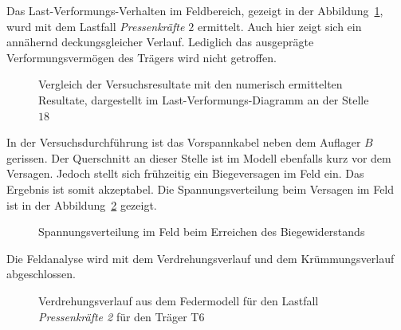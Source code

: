 \documentclass[
  11pt,
  letterpaper,
]{scrreprt}
\begin{document}
Das Last-Verformungs-Verhalten im Feldbereich, gezeigt in der
Abbildung~\ref{fig-q_w18_vergleich}, wurd mit dem Lastfall
\emph{Pressenkräfte \(2\)} ermittelt. Auch hier zeigt sich ein annähernd
deckungsgleicher Verlauf. Lediglich das ausgeprägte Verformungsvermögen
des Trägers wird nicht getroffen.

\begin{figure}[H]


\caption{\label{fig-q_w18_vergleich}Vergleich der Versuchsresultate mit
den numerisch ermittelten Resultate, dargestellt im
Last-Verformungs-Diagramm an der Stelle \(18\)}

\end{figure}%

In der Versuchsdurchführung ist das Vorspannkabel neben dem Auflager
\(B\) gerissen. Der Querschnitt an dieser Stelle ist im Modell ebenfalls
kurz vor dem Versagen. Jedoch stellt sich frühzeitig ein Biegeversagen
im Feld ein. Das Ergebnis ist somit akzeptabel. Die Spannungsverteilung
beim Versagen im Feld ist in der
Abbildung~\ref{fig-spannungsverteilung_ls12} gezeigt.

\begin{figure}[H]


\caption{\label{fig-spannungsverteilung_ls12}Spannungsverteilung im Feld
beim Erreichen des Biegewiderstands}

\end{figure}%

Die Feldanalyse wird mit dem Verdrehungsverlauf und dem Krümmungsverlauf
abgeschlossen.

\begin{figure}[H]


\caption{\label{fig-phi-t6_l12}Verdrehungsverlauf aus dem Federmodell
für den Lastfall \emph{Pressenkräfte 2} für den Träger T6}

\end{figure}%
\end{document}
